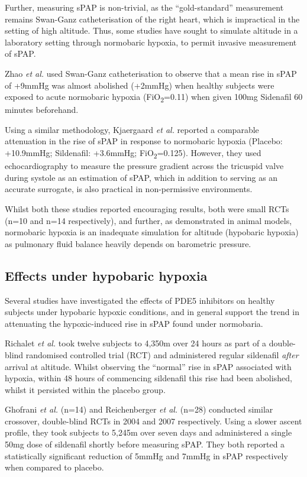 \documentclass[12pt,a4paper]{article}
\begin{document}
Further, measuring sPAP is non-trivial, as the ``gold-standard'' measurement remains Swan-Ganz catheterisation of the right heart, which is impractical in the setting of high altitude. Thus, some studies have sought to simulate altitude in a laboratory setting through normobaric hypoxia, to permit invasive measurement of sPAP.

Zhao \emph{et al.} used Swan-Ganz catheterisation to observe that a mean rise in sPAP of +9mmHg was almost abolished (+2mmHg) when healthy subjects were exposed to acute normobaric hypoxia (FiO\textsubscript{2}=0.11) when given 100mg Sidenafil 60 minutes beforehand.\cite{Zhao:2001kj}

Using a similar methodology, Kjaergaard \emph{et al.} reported a comparable attenuation in the rise of sPAP in response to normobaric hypoxia (Placebo: +10.9mmHg; Sildenafil: +3.6mmHg; FiO\textsubscript{2}=0.125).\cite{Kjaergaard:2007hp} However, they used echocardiography to measure the pressure gradient across the tricuspid valve during systole as an estimation of sPAP, which in addition to serving as an accurate surrogate, is also practical in non-permissive environments.\cite{Tramarin:1991uo,Allemann:2000tc}

Whilst both these studies reported encouraging results, both were small RCTs (n=10 and n=14 respectively), and further, as demonstrated in animal models, normobaric hypoxia is an inadequate simulation for altitude (hypobaric hypoxia) as pulmonary fluid balance heavily depends on barometric pressure.\cite{Bland:1977kz,Levine:1988uq}

\subsection*{Effects under hypobaric hypoxia}

Several studies have investigated the effects of PDE5 inhibitors on healthy subjects under hypobaric hypoxic conditions, and in general support the trend in attenuating the hypoxic-induced rise in sPAP found under normobaria.

Richalet \emph{et al.} took twelve subjects to 4,350m over 24 hours as part of a double-blind randomised controlled trial (RCT) and administered regular sildenafil \emph{after} arrival at altitude. Whilst observing the ``normal'' rise in sPAP associated with hypoxia, within 48 hours of commencing sildenafil this rise had been abolished, whilst it persisted within the placebo group.\cite{Richalet:2005el}

Ghofrani \emph{et al.}\cite{Ghofrani:2004gp} (n=14) and Reichenberger \emph{et al.}\cite{Reichenberger:2007bw} (n=28) conducted similar crossover, double-blind RCTs in 2004 and 2007 respectively. Using a slower ascent profile, they took subjects to 5,245m over seven days and administered a single 50mg dose of sildenafil shortly before measuring sPAP. They both reported a statistically significant reduction of 5mmHg and 7mmHg in sPAP respectively when compared to placebo.
\end{document}
